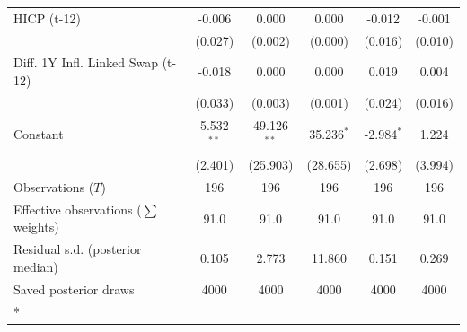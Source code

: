 \begin{longtable}[t]{lccccc}
HICP (t-12) & -0.006 & 0.000 & 0.000 & -0.012 & -0.001\\
 & (0.027) & (0.002) & (0.000) & (0.016) & (0.010)\\
Diff. 1Y Infl. Linked Swap (t-12) & -0.018 & 0.000 & 0.000 & 0.019 & 0.004\\
 & (0.033) & (0.003) & (0.001) & (0.024) & (0.016)\\
Constant & 5.532$^{**}$ & 49.126$^{**}$ & 35.236$^{*}$ & -2.984$^{*}$ & 1.224\\
 & (2.401) & (25.903) & (28.655) & (2.698) & (3.994)\\
\midrule
Observations ($T$) & 196 & 196 & 196 & 196 & 196\\
Effective observations ($\sum$ weights) & 91.0 & 91.0 & 91.0 & 91.0 & 91.0\\
Residual s.d. (posterior median) & 0.105 & 2.773 & 11.860 & 0.151 & 0.269\\
Saved posterior draws & 4000 & 4000 & 4000 & 4000 & 4000\\*
\end{longtable}
\endgroup{}

\begingroup\fontsize{7}{9}\selectfont


